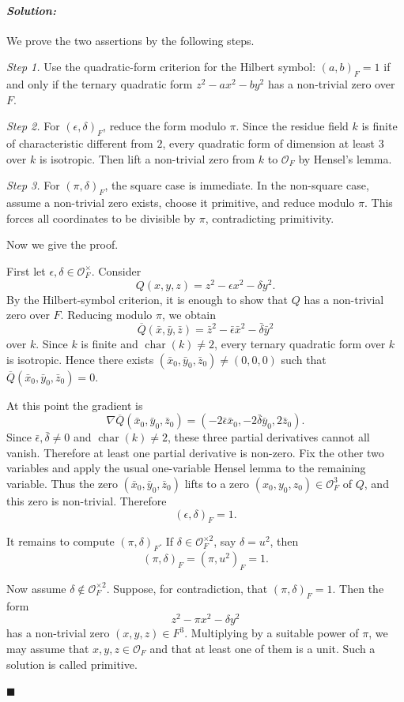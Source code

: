 \documentclass[12pt, a4paper]{article}
\newenvironment{solution}
  {\paragraph{\textit{Solution:}}\par\medskip}
  {\hfill$\blacksquare$\vspace{0.1cm}}
\begin{document}
\begin{solution}
We prove the two assertions by the following steps.

\emph{Step 1.} Use the quadratic-form criterion for the Hilbert symbol:
\((a,b)_F=1\) if and only if the ternary quadratic form
\(z^2-ax^2-by^2\) has a non-trivial zero over \(F\).

\emph{Step 2.} For \((\epsilon,\delta)_F\), reduce the form modulo \(\pi\).
Since the residue field \(k\) is finite of characteristic different from \(2\),
every quadratic form of dimension at least \(3\) over \(k\) is isotropic.
Then lift a non-trivial zero from \(k\) to \(\mathcal O_F\) by Hensel's lemma.

\emph{Step 3.} For \((\pi,\delta)_F\), the square case is immediate. In the
non-square case, assume a non-trivial zero exists, choose it primitive, and
reduce modulo \(\pi\). This forces all coordinates to be divisible by \(\pi\),
contradicting primitivity.

Now we give the proof.

First let \(\epsilon,\delta\in\mathcal O_F^\times\). Consider
\[
Q(x,y,z)=z^2-\epsilon x^2-\delta y^2.
\]
By the Hilbert-symbol criterion, it is enough to show that \(Q\) has a
non-trivial zero over \(F\). Reducing modulo \(\pi\), we obtain
\[
\overline Q(\bar x,\bar y,\bar z)
=\bar z^2-\bar\epsilon \bar x^2-\bar\delta \bar y^2
\]
over \(k\). Since \(k\) is finite and \(\operatorname{char}(k)\neq 2\), every
ternary quadratic form over \(k\) is isotropic. Hence there exists
\((\bar x_0,\bar y_0,\bar z_0)\neq (0,0,0)\) such that
\(\overline Q(\bar x_0,\bar y_0,\bar z_0)=0\).

At this point the gradient is
\[
\nabla\overline Q(\bar x_0,\bar y_0,\bar z_0)
=(-2\bar\epsilon\bar x_0,-2\bar\delta\bar y_0,2\bar z_0).
\]
Since \(\bar\epsilon,\bar\delta\neq 0\) and \(\operatorname{char}(k)\neq 2\),
these three partial derivatives cannot all vanish. Therefore at least one
partial derivative is non-zero. Fix the other two variables and apply the usual
one-variable Hensel lemma to the remaining variable. Thus the zero
\((\bar x_0,\bar y_0,\bar z_0)\) lifts to a zero
\((x_0,y_0,z_0)\in\mathcal O_F^3\) of \(Q\), and this zero is non-trivial.
Therefore
\[
(\epsilon,\delta)_F=1.
\]

It remains to compute \((\pi,\delta)_F\). If
\(\delta\in\mathcal O_F^{\times 2}\), say \(\delta=u^2\), then
\[
(\pi,\delta)_F=(\pi,u^2)_F=1.
\]

Now assume \(\delta\notin\mathcal O_F^{\times 2}\). Suppose, for contradiction,
that \((\pi,\delta)_F=1\). Then the form
\[
z^2-\pi x^2-\delta y^2
\]
has a non-trivial zero \((x,y,z)\in F^3\). Multiplying by a suitable power of
\(\pi\), we may assume that \(x,y,z\in\mathcal O_F\) and that at least one of
them is a unit. Such a solution is called primitive.


\end{solution}
\end{document}
